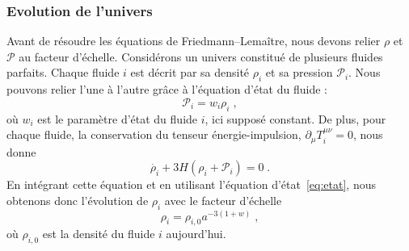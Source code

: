 \subsubsection{Evolution de l'univers}
Avant de résoudre les équations de Friedmann–Lemaître, nous devons relier $\rho$ et $\mathcal{P}$ au facteur d'échelle. Considérons un univers constitué de plusieurs fluides parfaits. Chaque fluide $i$ est décrit par sa densité $\rho_i$ et sa pression $\mathcal{P}_i$. Nous pouvons relier l'une à l'autre grâce à l'équation d'état du fluide :
\begin{equation}
  \label{eq:etat}
  \mathcal{P}_i = w_i \rho_i \; ,
\end{equation}
où $w_i$ est le paramètre d'état du fluide $i$, ici supposé constant.
De plus, pour chaque fluide, la conservation du tenseur énergie-impulsion, $\partial_{\mu} T_i^{\mu \nu} = 0$, nous donne
\begin{equation}
  \label{eq:conservation}
  \dot{\rho_i} + 3 H (\rho_i + \mathcal{P}_i) = 0  \; .
\end{equation}
En intégrant cette équation et en utilisant l'équation d'état~\ref{eq:etat}, nous obtenons donc l'évolution de $\rho_i$ avec le facteur d'échelle
\begin{equation}
  \label{eq:rho_vs_a}
  \rho_i = \rho_{i,0} a^{-3(1+w)}  \; ,
\end{equation}
où $\rho_{i,0}$ est la densité du fluide $i$ aujourd'hui.

